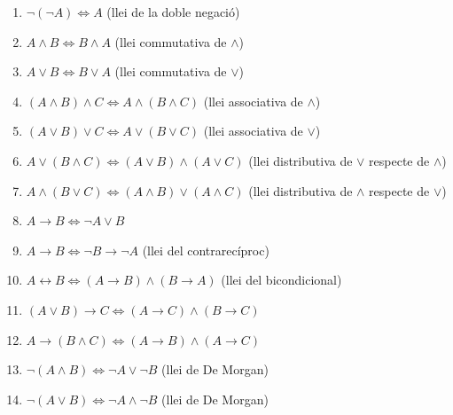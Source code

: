 \begin{enumerate}
\item $\lnot\left( \lnot A\right) \Longleftrightarrow A$ (llei de la doble
negació)

\item $A\wedge B\Longleftrightarrow B\wedge A$ (llei commutativa de $\wedge$)

\item $A\vee B\Longleftrightarrow B\vee A$ (llei commutativa de $\vee$)

\item $\left( A\wedge B\right) \wedge C\Longleftrightarrow A\wedge\left(
B\wedge C\right) $ (llei associativa de $\wedge$)

\item $\left( A\vee B\right) \vee C\Longleftrightarrow A\vee\left( B\vee
C\right) $ (llei associativa de $\vee$)

\item $A\vee\left( B\wedge C\right) \Longleftrightarrow\left( A\vee B\right)
\wedge\left( A\vee C\right) $ (llei distributiva de $\vee$ respecte de $\wedge$)

\item $A\wedge\left( B\vee C\right) \Longleftrightarrow\left( A\wedge
B\right) \vee\left( A\wedge C\right) $ (llei distributiva de $\wedge$
respecte de $\vee$)

\item $A\longrightarrow B\Longleftrightarrow\lnot A\vee B$

\item $A\longrightarrow B\Longleftrightarrow\lnot B\longrightarrow\lnot A$
(llei del contrarecíproc)

\item $A\longleftrightarrow B\Longleftrightarrow\left( A\longrightarrow
B\right) \wedge\left( B\longrightarrow A\right) $ (llei del bicondicional)

\item $\left( A\vee B\right) \longrightarrow C\Longleftrightarrow\left(
A\longrightarrow C\right) \wedge\left( B\longrightarrow C\right) $

\item $A\longrightarrow\left( B\wedge C\right) \Longleftrightarrow\left(
A\longrightarrow B\right) \wedge\left( A\longrightarrow C\right) $

\item $\lnot(A\wedge B)\Longleftrightarrow\lnot A\vee\lnot B$ (llei de De
Morgan)

\item $\lnot(A\vee B)\Longleftrightarrow\lnot A\wedge\lnot B$ (llei de De
Morgan)
\end{enumerate}

